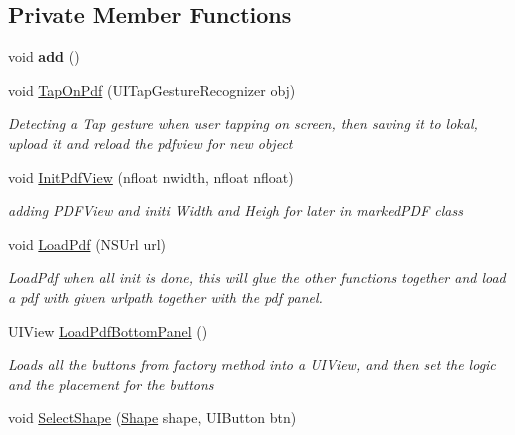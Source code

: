 \subsection*{Private Member Functions}
\begin{DoxyCompactItemize}
\item 
\mbox{\label{class_ramboell_1_1i_o_s_1_1_pdf_view_controller_a98592f0761cdfd7d542edae55741c557}} 
void {\bfseries add} ()
\item 
void \hyperlink{class_ramboell_1_1i_o_s_1_1_pdf_view_controller_a01454d9af76d631cb95d1654a11db485}{Tap\+On\+Pdf} (U\+I\+Tap\+Gesture\+Recognizer obj)
\begin{DoxyCompactList}\small\item\em Detecting a Tap gesture when user tapping on screen, then saving it to lokal, upload it and reload the pdfview for new object \end{DoxyCompactList}\item 
void \hyperlink{class_ramboell_1_1i_o_s_1_1_pdf_view_controller_a0d484e0bce9d3a84ed8a0e1847e2bc57}{Init\+Pdf\+View} (nfloat nwidth, nfloat nfloat)
\begin{DoxyCompactList}\small\item\em adding P\+D\+F\+View and initi Width and Heigh for later in marked\+P\+DF class \end{DoxyCompactList}\item 
void \hyperlink{class_ramboell_1_1i_o_s_1_1_pdf_view_controller_a99c92204a2fdec0fa8f085deda7c710a}{Load\+Pdf} (N\+S\+Url url)
\begin{DoxyCompactList}\small\item\em Load\+Pdf when all init is done, this will glue the other functions together and load a pdf with given urlpath together with the pdf panel. \end{DoxyCompactList}\item 
U\+I\+View \hyperlink{class_ramboell_1_1i_o_s_1_1_pdf_view_controller_a636b53fa9debf8c5e062be6df567afa1}{Load\+Pdf\+Bottom\+Panel} ()
\begin{DoxyCompactList}\small\item\em Loads all the buttons from factory method into a U\+I\+View, and then set the logic and the placement for the buttons \end{DoxyCompactList}\item 
void \hyperlink{class_ramboell_1_1i_o_s_1_1_pdf_view_controller_adcb7bc4fd260d2006f243bff72f2c7cb}{Select\+Shape} (\hyperlink{class_ramboell_1_1i_o_s_1_1_pdf_view_controller_ae9d97ce3c5ade4517fe1191c2dd25707}{Shape} shape, U\+I\+Button btn)

\end{DoxyCompactItemize}
